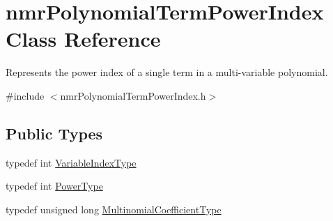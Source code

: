 \hypertarget{classnmr_polynomial_term_power_index}{}\section{nmr\+Polynomial\+Term\+Power\+Index Class Reference}
\label{classnmr_polynomial_term_power_index}


Represents the power index of a single term in a multi-\/variable polynomial.  




{\ttfamily \#include $<$nmr\+Polynomial\+Term\+Power\+Index.\+h$>$}

\subsection*{Public Types}
\begin{DoxyCompactItemize}
\item 
typedef int \hyperlink{classnmr_polynomial_term_power_index_ac982d5f82c3a95968e92d54c92cbc3e0}{Variable\+Index\+Type}
\item 
typedef int \hyperlink{classnmr_polynomial_term_power_index_a2eec01c3a2c3f56f47982ceffd8e36ed}{Power\+Type}
\item 
typedef unsigned long \hyperlink{classnmr_polynomial_term_power_index_a09f482da776cfb829e26ad1fb381ab94}{Multinomial\+Coefficient\+Type}
\end{DoxyCompactItemize}
